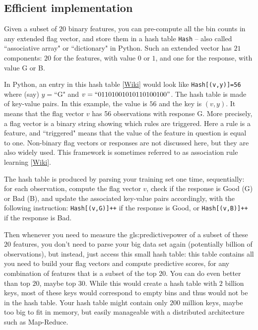 \documentclass[oneside,10pt]{book}
\begin{document}
\subsection{Efficient implementation} \label{effsdxc}

Given a subset of $20$ binary features, you can pre-compute all the bin counts in any extended \textcolor{index}{flag vector}, and store them in a hash table \texttt{Hash} -- also called 
 ``associative array"  or ``dictionary" in Python. Such an extended vector has $21$ components: 
$20$ for the features, with value  $0$ or $1$, and one for the response, with value G or B. 




In Python, an entry in this \textcolor{index}{hash table} [\href{https://en.wikipedia.org/wiki/Hash_table}{Wiki}] would look like \texttt{Hash[(v,y)]=56}
 where  (say)  $y=\text{``G"}$ and $v=``01101001010110100100"$.
The hash table is made of  \textcolor{index}{key-value pairs}. In this example, the value is $56$ and the key is $(v,y)$.
It means that the flag vector $v$ has 56 observations with response G. More precisely, a flag vector is a binary string showing which rules are triggered.  Here a rule is a feature, and ``triggered" means that the value of the feature in question is equal to one. Non-binary flag vectors or responses are not discussed here, but they are also widely used.  This framework is sometimes referred to as \textcolor{index}{association rule learning} [\href{https://en.wikipedia.org/wiki/Association_rule_learning}{Wiki}]. 

The hash table is produced by parsing your training set one time, sequentially: for each observation, compute the flag vector $v$, check if the response is Good (G) or Bad (B), and update the associated key-value pairs accordingly, with the following instruction:
\texttt{Hash[(v,G)]++} if the response is Good, or \texttt{Hash[(v,B)]++} if the response is Bad.



Then whenever you need to measure the \gls{gls:predictivepower} of a subset of these $20$ features, you don’t need to parse your big data set again (potentially billion of observations), but instead, just access this small hash table: this table contains all you need to build your flag vectors and compute predictive scores, for any combination of features that is a subset of the top $20$. You can  do even better than top $20$, maybe top $30$. While this would create a hash table with $2$ billion keys, most of these keys would correspond to empty bins and thus would not be in the hash table. Your hash table might contain only $200$ million keys, maybe too big to fit in  memory, but easily manageable with a distributed architecture such as Map-Reduce.
\end{document}
